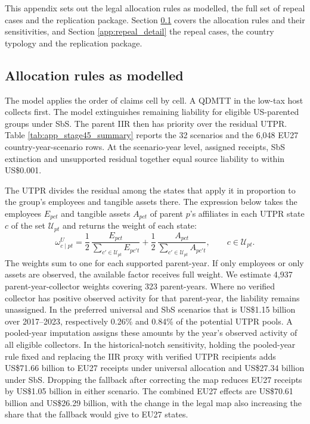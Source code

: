 \documentclass[11pt,a4paper]{article}
\newcommand{\usd}{US\$}
\begin{document}
This appendix sets out the legal allocation rules as modelled, the full set of repeal cases and the replication package. Section \ref{app:allocation_detail} covers the allocation rules and their sensitivities, and Section \ref{app:repeal_detail} the repeal cases, the country typology and the replication package.

\subsection{Allocation rules as modelled}\label{app:allocation_detail}

The model applies the order of claims cell by cell. A QDMTT in the low-tax host collects first. The model extinguishes remaining liability for eligible US-parented groups under SbS. The parent IIR then has priority over the residual UTPR. Table \ref{tab:app_stage45_summary} reports the 32 scenarios and the 6,048 EU27 country-year-scenario rows. At the scenario-year level, assigned receipts, SbS extinction and unsupported residual together equal source liability to within \usd0.001.



The UTPR divides the residual among the states that apply it in proportion to the group's employees and tangible assets there. The expression below takes the employees $E_{pct}$ and tangible assets $A_{pct}$ of parent $p$'s affiliates in each UTPR state $c$ of the set $\mathcal U_{pt}$ and returns the weight of each state:
\begin{equation}\label{eq:app_utpr}
\omega^{U}_{c\mid pt}=\frac12\,\frac{E_{pct}}{\sum_{c'\in\mathcal U_{pt}}E_{pc't}}+\frac12\,\frac{A_{pct}}{\sum_{c'\in\mathcal U_{pt}}A_{pc't}},\qquad c\in\mathcal U_{pt}.
\end{equation}
The weights sum to one for each supported parent-year. If only employees or only assets are observed, the available factor receives full weight. We estimate 4,937 parent-year-collector weights covering 323 parent-years. Where no verified collector has positive observed activity for that parent-year, the liability remains unassigned. In the preferred universal and SbS scenarios that is \usd1.15 billion over 2017–2023, respectively 0.26\% and 0.84\% of the potential UTPR pools. A pooled-year imputation assigns these amounts by the year's observed activity of all eligible collectors. In the historical-notch sensitivity, holding the pooled-year rule fixed and replacing the IIR proxy with verified UTPR recipients adds \usd71.66 billion to EU27 receipts under universal allocation and \usd27.34 billion under SbS. Dropping the fallback after correcting the map reduces EU27 receipts by \usd1.05 billion in either scenario. The combined EU27 effects are \usd70.61 billion and \usd26.29 billion, with the change in the legal map also increasing the share that the fallback would give to EU27 states.
\end{document}
